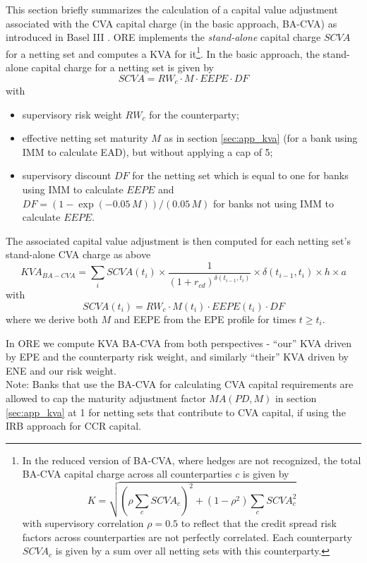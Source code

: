 \documentclass[12pt, a4paper]{article}
\newcommand{\CVA}{\mathit{CVA}}
\newcommand{\KVA}{\mathit{KVA}}
\newcommand{\EEPE}{\mathit{EEPE}}
\newcommand{\RW}{\mathit{RW}}
\newcommand{\PD}{\mathit{PD}}
\newcommand{\DF}{\mathit{DF}}
\newcommand{\MA}{\mathit{MA}}
\newcommand{\SCVA}{\mathit{SCVA}}
\begin{document}
{{\begin{appendix}
This section briefly summarizes the calculation of a capital value adjustment associated with the CVA capital charge (in the basic approach, BA-CVA) as introduced in Basel III \cite{bcbs189, d325, d424}. ORE implements the {\em stand-alone} capital charge $\SCVA$ for a netting set and computes a KVA for it\footnote{In the reduced version of BA-CVA, where hedges are not recognized, the total BA-CVA capital charge across all counterparties $c$ is given by
$$
K = \sqrt{\left(\rho \sum_c \SCVA_c\right)^2 +(1-\rho^2)\sum_c \SCVA_c^2}
$$  
with supervisory correlation $\rho=0.5$ to reflect that the credit spread risk factors across counterparties are not perfectly correlated. Each counterparty $\SCVA_c$ is given by a sum over all netting sets with this counterparty.}. In the basic approach, the stand-alone capital charge for a netting set is given by
$$
\SCVA = \RW_c\cdot M\cdot \EEPE \cdot\DF
$$
with 
\begin{itemize}
\item supervisory risk weight $\RW_c$ for the counterparty;
\item effective netting set maturity $M$ as in section \ref{sec:app_kva} (for a bank using IMM to calculate EAD), but without applying a cap of 5;
\item supervisory discount $\DF$ for the netting set which is equal to one for banks using IMM to calculate $\EEPE$ and $\DF=\left(1-\exp\left(-0.05\,M\right)\right)/(0.05\,M)$ for banks not using IMM to calculate $\EEPE$. 
\end{itemize}

The associated capital value adjustment is then computed for each netting set's stand-alone CVA charge as above
$$
\KVA_{BA-\CVA} = \sum_i \SCVA(t_i) \times \frac{1}{ (1 + r_{cd})^{\delta(t_{i-1}, t_i)}} \times \delta(t_{i-1}, t_i) \times h \times a
$$
with 
$$
\SCVA(t_i) = \RW_c \cdot M(t_i)\cdot \EEPE(t_i)\cdot\DF
$$
where we derive both $M$ and EEPE from the EPE profile for times $t\geq t_i$.

In ORE we compute KVA BA-CVA from both perspectives - ``our'' KVA driven by EPE and the counterparty risk weight, and similarly ``their'' KVA driven by ENE and our risk weight. \\

Note: Banks that use the BA-CVA for calculating CVA capital requirements are allowed to cap the maturity adjustment factor $\MA(\PD,M)$ in section \ref{sec:app_kva} at 1 for netting sets that contribute to CVA capital, if using the IRB approach for CCR capital.


\end{appendix}}}
\end{document}
